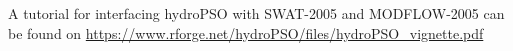 \documentclass{article}
\begin{document}
%
A tutorial for interfacing hydroPSO with SWAT-2005 and MODFLOW-2005 can be found on \href{https://www.rforge.net/hydroPSO/files/hydroPSO\_vignette.pdf}{https://www.rforge.net/hydroPSO/files/hydroPSO\_vignette.pdf}
\end{document}

